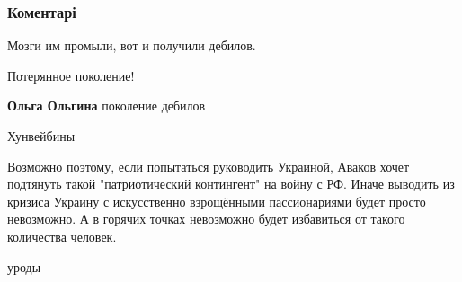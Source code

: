  
 
 
 
 
\subsubsection{Коментарі}
\label{sec:14_10_2021.fb.fb_group.respublika_lnr.1.deti_pokolenie_pesnja_bandera.cmt}

\begin{itemize} %
Мозги им промыли, вот и получили дебилов.

Потерянное поколение!

\begin{itemize} %
\textbf{Ольга Ольгина} поколение дебилов
\end{itemize} %

Хунвейбины


Возможно поэтому, если попытаться руководить Украиной, Аваков хочет подтянуть
такой "патриотический контингент" на войну с РФ. Иначе выводить из кризиса
Украину с искусственно взрощёнными пассионариями будет просто невозможно. А в
горячих точках невозможно будет избавиться от такого количества человек.

уроды

\end{itemize} %
